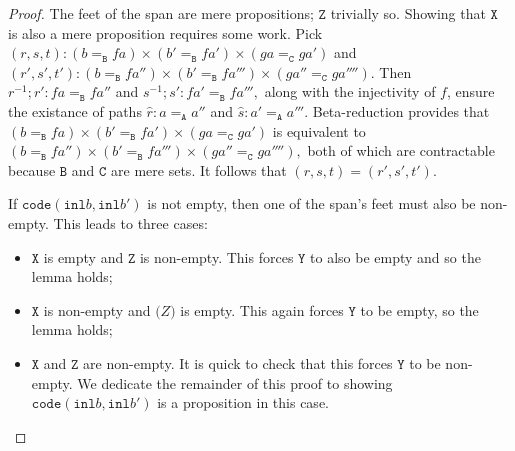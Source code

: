 \documentclass[12pt]{amsart}
\newcommand{\inv}{^{-1}}
\newcommand{\type}[1]{\mathtt{#1}}
\newcommand{\tin}{\colon}
\newcommand{\A}{\type{A}}
\newcommand{\B}{\type{B}}
\newcommand{\C}{\type{C}}
\newcommand{\inl}{\type{inl}}
\newcommand{\code}{\type{code}}
\theoremstyle{remark}
\theoremstyle{definition}
\begin{document}
\begin{proof}
%  
  The feet of the span are mere propositions; \( \type{Z} \) trivially
  so. Showing that \( \type{X} \) is also a mere proposition requires
  some work. Pick
  \(
      ( r,s,t ) \tin
      ( b =_\B fa ) \times ( b' =_\B fa') \times ( ga =_\C ga' )
  \)
  and
  \(
      ( r',s',t' ) \tin
      ( b =_\B fa'' ) \times ( b' =_\B fa''') \times ( ga'' =_\C ga'''').
  \)
  Then
  \(
      r\inv ; r' \tin fa =_\B fa''
  \)
  and
  \(
      s\inv ; s' \tin fa' =_\B fa''',
  \)
  along with the injectivity of \( f \), ensure the existance of paths
  \(
      \hat{r} \tin a =_\A a''
  \)
  and
  \(
      \hat{s} \tin a' =_\A a'''.
  \)
  Beta-reduction provides that
  \(
      ( b =_\B fa ) \times ( b' =_\B fa') \times ( ga =_\C ga' )
  \)
  is equivalent to
  \(
     ( b =_\B fa'' ) \times ( b' =_\B fa''') \times ( ga'' =_\C ga'''' ),
  \)
  both of which are contractable because \( \B \) and \( \C \)
  are mere sets.  It follows that
  \(
      ( r,s,t ) = ( r',s',t' ).
  \)
  \par

  If
  \(
      \code ( \inl b , \inl b' )
  \)
  is not empty, then one of the span's feet must also be
  non-empty.  This leads to three cases:
  \begin{itemize}
  \item
    \( \type{X} \) is empty and \( \type{Z} \) is non-empty. This
    forces \( \type{Y} \) to also be empty and so the lemma holds;
  \item
    \( \type{X} \) is non-empty and \( \type(Z) \) is empty. This
    again forces \( \type{Y} \) to be empty, so the lemma holds;
  \item
    \( \type{X} \) and \( \type{Z} \) are non-empty. It is quick to check
    that this forces \( \type{Y} \) to be non-empty. We dedicate the
    remainder of this proof to showing \( \code ( \inl b , \inl b' )
    \) is a proposition in this case.
  \end{itemize}
  

\end{proof}
\end{document}
